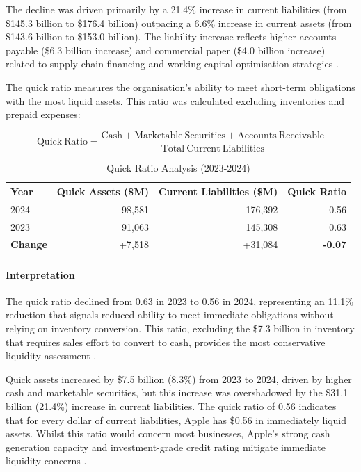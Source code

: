 \documentclass[12pt,a4paper]{article}
\begin{document}
The decline was driven primarily by a 21.4\% increase in current liabilities (from \$145.3 billion to \$176.4 billion) outpacing a 6.6\% increase in current assets (from \$143.6 billion to \$153.0 billion). The liability increase reflects higher accounts payable (\$6.3 billion increase) and commercial paper (\$4.0 billion increase) related to supply chain financing and working capital optimisation strategies \citep{apple202410k}.

The quick ratio measures the organisation's ability to meet short-term obligations with the most liquid assets. This ratio was calculated excluding inventories and prepaid expenses:

\begin{equation}
\mathrm{Quick\ Ratio} = \frac{\mathrm{Cash} + \mathrm{Marketable\ Securities} + \mathrm{Accounts\ Receivable}}{\mathrm{Total\ Current\ Liabilities}}
\end{equation}

\begin{table}[H]
\centering
\caption{Quick Ratio Analysis (2023-2024)}
\label{tab:quick_ratio}
\begin{tabular}{lrrr}
\toprule
\textbf{Year} & \textbf{Quick Assets (\$M)} & \textbf{Current Liabilities (\$M)} & \textbf{Quick Ratio} \\
\midrule
2024 & 98,581 & 176,392 & 0.56 \\
2023 & 91,063 & 145,308 & 0.63 \\
\textbf{Change} & +7,518 & +31,084 & \textbf{-0.07} \\
\bottomrule
\end{tabular}
\end{table}

\paragraph{Interpretation}

The quick ratio declined from 0.63 in 2023 to 0.56 in 2024, representing an 11.1\% reduction that signals reduced ability to meet immediate obligations without relying on inventory conversion. This ratio, excluding the \$7.3 billion in inventory that requires sales effort to convert to cash, provides the most conservative liquidity assessment \citep{apple202410k}.

Quick assets increased by \$7.5 billion (8.3\%) from 2023 to 2024, driven by higher cash and marketable securities, but this increase was overshadowed by the \$31.1 billion (21.4\%) increase in current liabilities. The quick ratio of 0.56 indicates that for every dollar of current liabilities, Apple has \$0.56 in immediately liquid assets. Whilst this ratio would concern most businesses, Apple's strong cash generation capacity and investment-grade credit rating mitigate immediate liquidity concerns \citep{kieso2023}.
\end{document}

